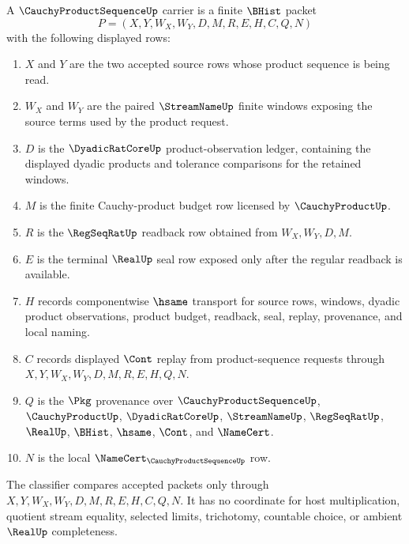 \begin{definition}
\label{def:cauchy-product-sequence-carrier}
A $\CauchyProductSequenceUp$ carrier is a finite $\BHist$ packet
$$
P=(X,Y,W_X,W_Y,D,M,R,E,H,C,Q,N)
$$
with the following displayed rows:
\begin{enumerate}
\item $X$ and $Y$ are the two accepted source rows whose product sequence is being read.
\item $W_X$ and $W_Y$ are the paired $\StreamNameUp$ finite windows exposing the source terms used by the product request.
\item $D$ is the $\DyadicRatCoreUp$ product-observation ledger, containing the displayed dyadic products and tolerance comparisons for the retained windows.
\item $M$ is the finite Cauchy-product budget row licensed by $\CauchyProductUp$.
\item $R$ is the $\RegSeqRatUp$ readback row obtained from $W_X,W_Y,D,M$.
\item $E$ is the terminal $\RealUp$ seal row exposed only after the regular readback is available.
\item $H$ records componentwise $\hsame$ transport for source rows, windows, dyadic product observations, product budget, readback, seal, replay, provenance, and local naming.
\item $C$ records displayed $\Cont$ replay from product-sequence requests through $X,Y,W_X,W_Y,D,M,R,E,H,Q,N$.
\item $Q$ is the $\Pkg$ provenance over $\CauchyProductSequenceUp$, $\CauchyProductUp$, $\DyadicRatCoreUp$, $\StreamNameUp$, $\RegSeqRatUp$, $\RealUp$, $\BHist$, $\hsame$, $\Cont$, and $\NameCert$.
\item $N$ is the local $\NameCert_{\CauchyProductSequenceUp}$ row.
\end{enumerate}
The classifier compares accepted packets only through $X,Y,W_X,W_Y,D,M,R,E,H,C,Q,N$. It has no coordinate for host multiplication, quotient stream equality, selected limits, trichotomy, countable choice, or ambient $\RealUp$ completeness.
\end{definition}

